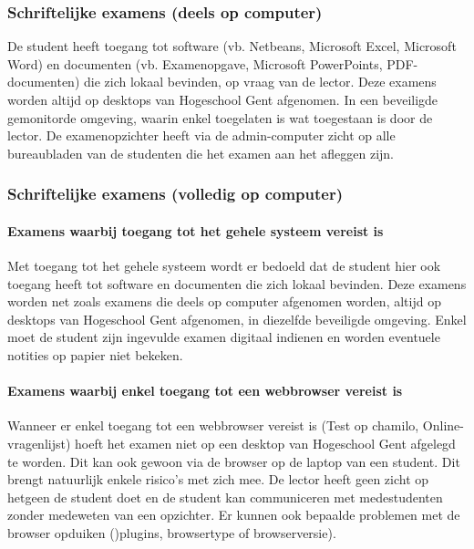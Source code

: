 \subsubsection{Schriftelijke examens (deels op computer) }

De student heeft toegang tot software (vb. Netbeans, Microsoft Excel, Microsoft Word) en documenten (vb. Examenopgave, Microsoft PowerPoints, PDF-documenten) die zich lokaal bevinden, op vraag van de lector. Deze examens worden altijd op desktops van Hogeschool Gent afgenomen. In een beveiligde gemonitorde omgeving, waarin enkel toegelaten is wat toegestaan is door de lector. De examenopzichter heeft via de admin-computer zicht op alle bureaubladen van de studenten die het examen aan het afleggen zijn. 




\subsubsection{Schriftelijke examens (volledig op computer)}

\paragraph{Examens waarbij toegang tot het gehele systeem vereist is}

Met toegang tot het gehele systeem wordt er bedoeld dat de student hier ook toegang heeft tot software  en documenten die zich lokaal bevinden. Deze examens worden net zoals examens die deels op computer afgenomen worden, altijd op desktops van Hogeschool Gent afgenomen, in diezelfde beveiligde omgeving. Enkel moet de student zijn ingevulde examen digitaal indienen en worden eventuele notities op papier niet bekeken.  

\paragraph{Examens waarbij enkel toegang tot een webbrowser vereist is}

Wanneer er enkel toegang tot een webbrowser vereist is (Test op chamilo, Online-vragenlijst) hoeft het examen niet op een desktop van Hogeschool Gent afgelegd te worden. Dit kan ook gewoon via de browser op de laptop van een student. Dit brengt natuurlijk enkele risico's met zich mee. De lector heeft geen zicht op hetgeen de student doet en de student kan communiceren met medestudenten zonder medeweten van een opzichter. Er kunnen ook bepaalde problemen met de browser opduiken ()plugins, browsertype of browserversie). 

